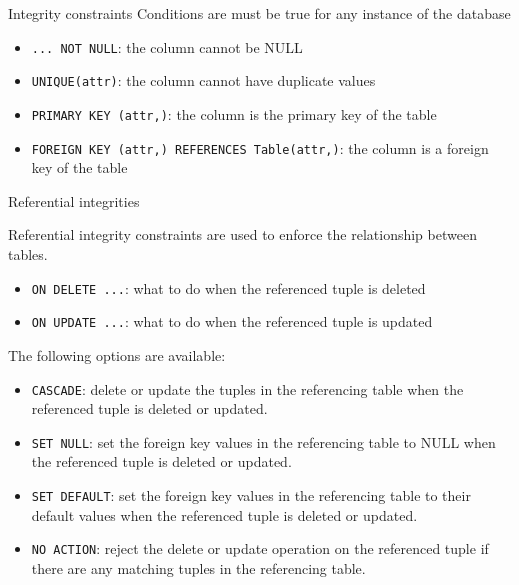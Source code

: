 \begin{definition}
    {Integrity constraints}
    Conditions are must be true for any instance of the database

    \begin{itemize}
        \item \texttt{... NOT NULL}: the column cannot be NULL
        \item \texttt{UNIQUE(attr)}: the column cannot have duplicate values
        \item \texttt{PRIMARY KEY (attr,)}: the column is the primary key of the table
        \item \texttt{FOREIGN KEY (attr,) REFERENCES Table(attr,)}: the column is a foreign key of the table
    \end{itemize}

\end{definition}

\begin{definition}
    {Referential integrities}

    Referential integrity constraints are used to enforce the relationship between tables.

    \begin{itemize}
        \item \texttt{ON DELETE ...}: what to do when the referenced tuple is deleted
        \item \texttt{ON UPDATE ...}: what to do when the referenced tuple is updated
    \end{itemize}

    The following options are available:

    \begin{itemize}
        \item \texttt{CASCADE}: delete or update the tuples in the referencing table when the referenced tuple is deleted or updated.
        \item \texttt{SET NULL}: set the foreign key values in the referencing table to NULL when the referenced tuple is deleted or updated.
        \item \texttt{SET DEFAULT}: set the foreign key values in the referencing table to their default values when the referenced tuple is deleted or updated.
        \item \texttt{NO ACTION}: reject the delete or update operation on the referenced tuple if there are any matching tuples in the referencing table.
    \end{itemize}
\end{definition}

